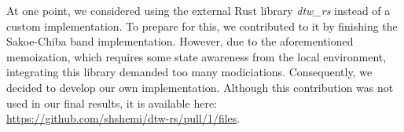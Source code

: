 At one point, we considered using the external Rust library \textit{dtw\_rs} instead of a custom implementation. To prepare for this, we contributed to it by finishing the Sakoe-Chiba band implementation. However, due to the aforementioned memoization, which requires some state awareness from the local environment, integrating this library demanded too many modiciations. Consequently, we decided to develop our own implementation. Although this contribution was not used in our final results, it is available here: \\ \href{https://github.com/shshemi/dtw-rs/pull/1/files}{https://github.com/shshemi/dtw-rs/pull/1/files}.